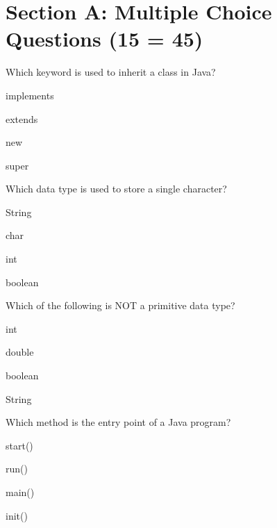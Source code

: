 \documentclass{USTBExam}
\begin{document}
\maketitle

\section{Section A: Multiple Choice Questions (15  = 45)}

\begin{question}
Which keyword is used to inherit a class in Java?
\paren
\begin{choices}
\item implements
\item extends
\item new
\item super
\end{choices}
\end{question}

\begin{question}
Which data type is used to store a single character?
\paren
\begin{choices}
\item String
\item char
\item int
\item boolean
\end{choices}
\end{question}

\begin{question}
Which of the following is NOT a primitive data type?
\paren
\begin{choices}
\item int
\item double
\item boolean
\item String
\end{choices}
\end{question}

\begin{question}
Which method is the entry point of a Java program?
\paren
\begin{choices}
\item start()
\item run()
\item main()
\item init()
\end{choices}
\end{question}
\end{document}

